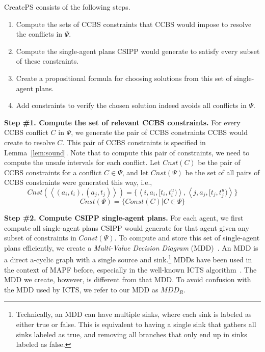 \documentclass[review]{elsarticle}
\newcommand{\tuple}[1]{\ensuremath{\left \langle #1 \right \rangle }}
\newcommand{\mddr}{\ensuremath{MDD_R}\xspace}
\newcommand{\ccbs}{\ac{CCBS}\xspace}
\newcommand{\csipp}{\ac{CSIPP}\xspace}
\newcommand{\ps}{\ac{PS}\xspace}
\newcommand{\mapf}{\ac{MAPF}\xspace}
\begin{document}


CreatePS consists of the following steps. 
\begin{enumerate}
	\item Compute the sets of \ccbs constraints that \ccbs would impose to resolve the conflicts in $\Psi$. 
	\item Compute the single-agent plans \csipp would generate to satisfy every subset of these constraints. 
	\item Create a propositional formula for choosing solutions from this set of single-agent plans. 
	\item Add constraints to verify the chosen solution indeed avoids all conflicts in $\Psi$. 
\end{enumerate}



\noindent \textbf{Step \#1. Compute the set of relevant \ccbs constraints.}
For every \ccbs conflict $C$ in $\Psi$, we generate the pair of \ccbs constraints \ccbs would create to resolve $C$. 
This pair of \ccbs constraints is specified in Lemma~\ref{lem:sound}. 
Note that to compute this pair of constraints, we need to compute the unsafe intervals for each conflict. 
Let $Cnst(C)$ be the pair of \ccbs constraints for a conflict $C\in \Psi$, 
and let $Cnst(\Psi)$ be the set of all pairs of \ccbs constraints were generated this way, i.e., 
\begin{equation}
Cnst(\tuple{ (a_i, t_i), (a_j,t_j) }) = \{ \tuple{i, a_i, [t_i, t_i^u)}, \tuple{j, a_j, [t_j, t_j^u)} \}
\end{equation}
\begin{equation}
Cnst(\Psi) = \{ Const(C) | C\in \Psi\} 
\end{equation}


\noindent \textbf{Step \#2. Compute \csipp single-agent plans.}
For each agent, we first compute all single-agent plans \csipp would generate for that agent given any subset of constraints in $Const(\Psi)$. 
To compute and store this set of single-agent plans efficiently, we create a 
\emph{Multi-Value Decision Diagram} (MDD)~\cite{srinivasan1990algorithms}. 
An MDD is a direct a-cyclic graph with a single source and sink.\footnote{Technically, an MDD can have multiple sinks, where each sink is labeled as either true or false. This is equivalent to having a single sink that gathers all sinks labeled as true, and removing all branches that only end up in sinks labeled as false.}
MDDs have been used in the context of \mapf before, especially in the well-known ICTS algorithm~\cite{sharon2013increasing}. 
The MDD we create, however, is different from that MDD. 
To avoid confusion with the MDD used by ICTS, we refer to our MDD as \mddr. 
\end{document}
